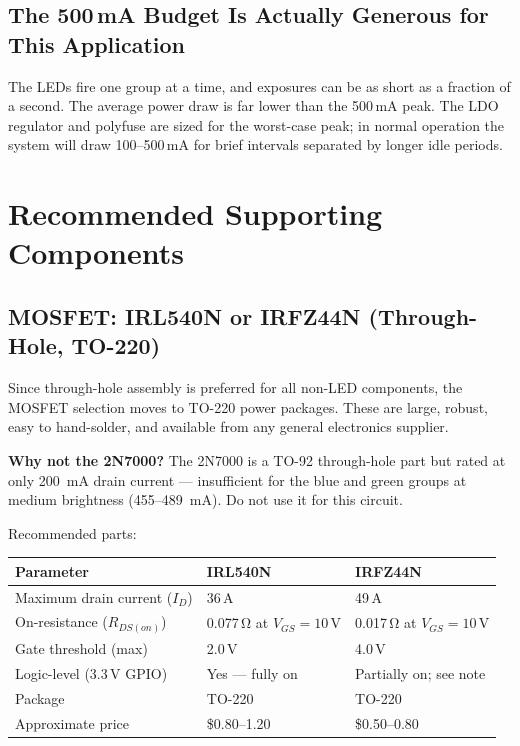 \documentclass[12pt,letterpaper]{article}
\begin{document}
\subsection{The 500\,mA Budget Is Actually Generous for This Application}

The LEDs fire one group at a time, and exposures can be as short as a fraction of a
second. The average power draw is far lower than the 500\,mA peak. The LDO regulator
and polyfuse are sized for the worst-case peak; in normal operation the system will
draw 100--500\,mA for brief intervals separated by longer idle periods.

\section{Recommended Supporting Components}

\subsection{MOSFET: IRL540N or IRFZ44N (Through-Hole, TO-220)}

Since through-hole assembly is preferred for all non-LED components, the MOSFET
selection moves to TO-220 power packages. These are large, robust, easy to hand-solder,
and available from any general electronics supplier.

\textbf{Why not the 2N7000?} The 2N7000 is a TO-92 through-hole part but rated at only
200~mA drain current --- insufficient for the blue and green groups at medium brightness
(455--489~mA). Do not use it for this circuit.

Recommended parts:

\begin{center}
\begin{tabular}{lll}
\toprule
\textbf{Parameter} & \textbf{IRL540N} & \textbf{IRFZ44N} \\
\midrule
Maximum drain current ($I_D$) & 36\,A & 49\,A \\
On-resistance ($R_{DS(on)}$) & 0.077\,\si{\ohm} at $V_{GS}=10$\,V & 0.017\,\si{\ohm} at $V_{GS}=10$\,V \\
Gate threshold (max) & 2.0\,V & 4.0\,V \\
Logic-level (3.3\,V GPIO) & Yes --- fully on & Partially on; see note \\
Package & TO-220 & TO-220 \\
Approximate price & \$0.80--1.20 & \$0.50--0.80 \\
\bottomrule
\end{tabular}
\end{center}
\end{document}

